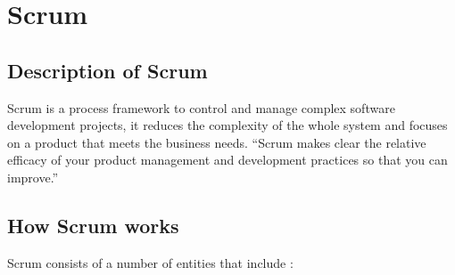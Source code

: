 \section{Scrum}

\subsection{Description of Scrum}
Scrum is a process framework to control and manage complex software development projects, it reduces the complexity of the whole system and focuses on a product that meets the business needs. ``Scrum makes clear the relative efficacy of your product management and development practices so that you can improve.'' \cite{ScrumGuide}

\subsection{How Scrum works}
Scrum consists of a number of entities that include \cite{WhatIsScrum}:
